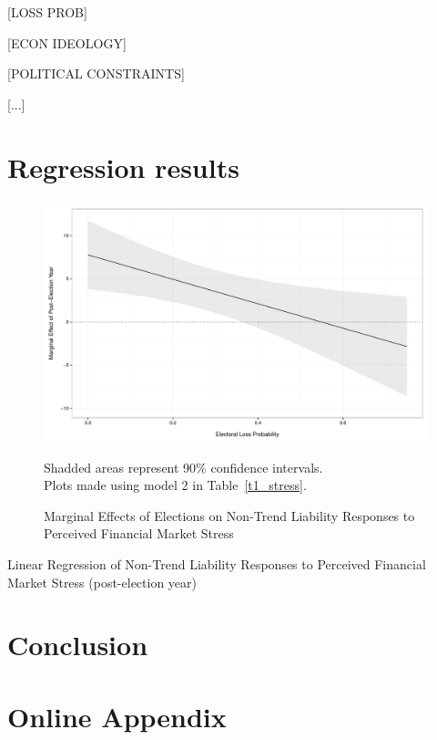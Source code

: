 \documentclass[]{article}
\begin{document}
[LOSS PROB]

[ECON IDEOLOGY]

[POLITICAL CONSTRAINTS]

[...]

\section{Regression results}

\begin{figure}
    \caption{Marginal Effects of Elections on Non-Trend Liability Responses to Perceived Financial Market Stress}
    \label{me_liab_stress}

    \begin{center}
        \includegraphics[scale=0.5]{analysis/figures/me_liab_stress.pdf}
    \end{center}

    {\scriptsize{Shadded areas represent 90\% confidence intervals. \\
    Plots made using model 2 in Table~\ref{t1_stress}.}}

\end{figure}

\begin{table}
    \caption{Linear Regression of Non-Trend Liability Responses to Perceived Financial Market Stress (post-election year)}
    \label{t1_stress}

    \begin{center}
        
    \end{center}

\end{table}


\section*{Conclusion}







\section{Online Appendix}


\end{document}
